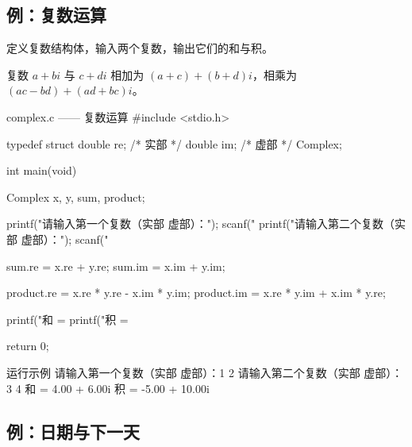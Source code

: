 \subsection{例：复数运算}

\begin{example}
定义复数结构体，输入两个复数，输出它们的和与积。
\end{example}
\begin{solution}
复数 $a + bi$ 与 $c + di$ 相加为 $(a+c) + (b+d)i$，相乘为 $(ac-bd) + (ad+bc)i$。

\begin{codebox}{complex.c —— 复数运算}
#include <stdio.h>

typedef struct {
    double re;      /* 实部 */
    double im;      /* 虚部 */
} Complex;

int main(void)
{
    Complex x, y, sum, product;

    printf("请输入第一个复数（实部 虚部）：");
    scanf("%
    printf("请输入第二个复数（实部 虚部）：");
    scanf("%

    sum.re = x.re + y.re;
    sum.im = x.im + y.im;

    product.re = x.re * y.re - x.im * y.im;
    product.im = x.re * y.im + x.im * y.re;

    printf("和 = %
    printf("积 = %

    return 0;
}
\end{codebox}

\begin{outbox}{运行示例}
请输入第一个复数（实部 虚部）：1 2
请输入第二个复数（实部 虚部）：3 4
和 = 4.00 + 6.00i
积 = -5.00 + 10.00i
\end{outbox}
\end{solution}

\subsection{例：日期与下一天}

